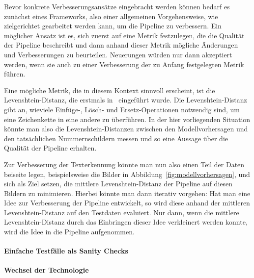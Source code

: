 Bevor konkrete Verbesserungsans\"atze eingebracht werden k\"onnen bedarf
es zun\"achst eines Frameworks, also einer allgemeinen Vorgehensweise,
wie zielgerichtet gearbeitet werden kann, um die Pipeline zu verbessern.
Ein m\"oglicher Ansatz ist es, sich zuerst auf eine Metrik festzulegen,
die die Qualit\"at
der Pipeline beschreibt und dann anhand dieser Metrik m\"ogliche
\"Anderungen und Verbesserungen zu beurteilen.
Neuerungen w\"urden nur dann akzeptiert werden, wenn sie auch zu einer
Verbesserung der zu Anfang festgelegten Metrik f\"uhren.

Eine m\"ogliche Metrik, die in diesem Kontext sinnvoll erscheint,
ist die Levenshtein-Distanz, die erstmals in~\cite{levenshtein}
eingef\"uhrt wurde.
Die Levenshtein-Distanz gibt an, wieviele Einf\"uge-, L\"osch- und
Ersetz-Operationen notwendig sind, um eine Zeichenkette in eine
andere zu \"uberf\"uhren.
In der hier vorliegenden Situation k\"onnte man also die
Levenshtein-Distanzen zwischen den Modellvorhersagen und den
tats\"achlichen Nummernschildern messen und so eine Aussage \"uber
die Qualit\"at der Pipeline erhalten.

Zur Verbesserung der Texterkennung k\"onnte man nun also einen Teil der
Daten beiseite legen, beispielsweise die Bilder in Abbildung~\ref{fig:modellvorhersagen},
und sich als Ziel setzen, die mittlere Levenshtein-Distanz der
Pipeline auf diesen Bildern zu minimieren.
Hierbei k\"onnte man dann iterativ vorgehen: Hat man eine Idee zur
Verbesserung der Pipeline entwickelt, so wird diese anhand der
mittleren Levenshtein-Distanz auf den Testdaten evaluiert.
Nur dann, wenn die mittlere Levenshtein-Distanz durch das Einbringen
dieser Idee verkleinert werden konnte, wird die Idee in die Pipeline
aufgenommen.

\paragraph{Einfache Testf\"alle als \glqq Sanity Checks\grqq{}}

\paragraph{Wechsel der Technologie}

